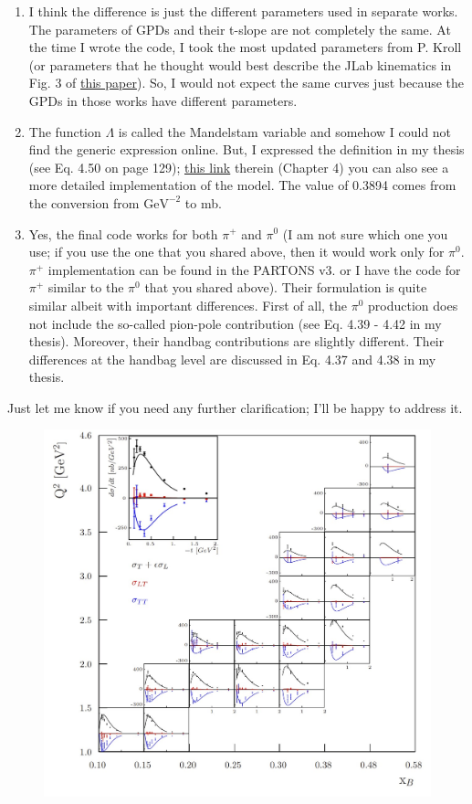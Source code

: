     \begin{enumerate}
        \item I think the difference is just the different parameters used in separate works. The parameters of GPDs and their t-slope are not completely the same. At the time I wrote the code, I took the most updated parameters from P. Kroll (or parameters that he thought would best describe the JLab kinematics in Fig. 3 of \href{https://arxiv.org/pdf/2007.15677.pdf}{this paper}). So, I would not expect the same curves just because the GPDs in those works have different parameters.
    
        \item The function $\Lambda$ is called the Mandelstam variable and somehow I could not find the generic expression online. But, I expressed the definition in my thesis (see Eq. 4.50 on page 129); \href{https://www.osti.gov/biblio/1881460}{this link} therein (Chapter 4) you can also see a more detailed implementation of the model. The value of 0.3894 comes from the conversion from $\text{GeV}^{-2}$ to mb.
    
        \item Yes, the final code works for both $\pi^+$ and $\pi^0$ (I am not sure which one you use; if you use the one that you shared above, then it would work only for $\pi^0$. $\pi^+$ implementation can be found in the PARTONS v3. or I have the code for $\pi^+$ similar to the $\pi^0$ that you shared above). Their formulation is quite similar albeit with important differences. First of all, the $\pi^0$ production does not include the so-called pion-pole contribution (see Eq. 4.39 - 4.42 in my thesis). Moreover, their handbag contributions are slightly different. Their differences at the handbag level are discussed in Eq. 4.37 and 4.38 in my thesis.
    \end{enumerate}
    
    Just let me know if you need any further clarification; I'll be happy to address it.
    
    
    
    
    
    
    
    \begin{figure}[hbt]
    	\centering
    	\includegraphics[page=6,width=0.6\linewidth]{Chapters/Ch5-Further/GK_model/pics/clas6comp.jpg}
    \end{figure}\label{fig:oldres}
    
